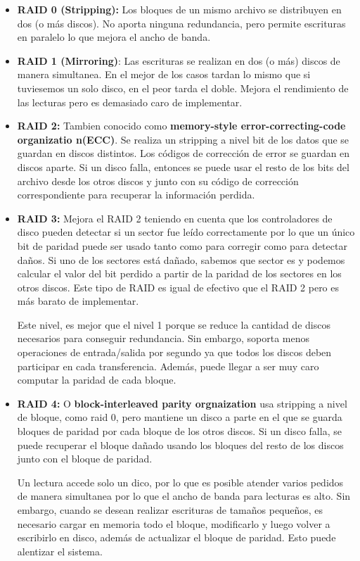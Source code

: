 \begin{itemize}
	\item \textbf{RAID 0 (Stripping):} Los bloques de un mismo archivo se distribuyen en dos (o más discos). No aporta ninguna redundancia, pero permite escrituras en paralelo lo que mejora el ancho de banda.
	\item \textbf{RAID 1 (Mirroring)}: Las escrituras se realizan en dos (o más) discos de manera simultanea. En el mejor de los casos tardan lo mismo que si tuviesemos un solo disco, en el peor tarda el doble. Mejora el rendimiento de las lecturas pero es demasiado caro de implementar.
	\item \textbf{RAID 2:} Tambien conocido como \textbf{memory-style error-correcting-code organizatio n(ECC)}. Se realiza un stripping a nivel bit de los datos que se guardan en discos distintos. Los códigos de corrección de error se guardan en discos aparte. Si un disco falla, entonces se puede usar el resto de los bits del archivo desde los otros discos y junto con su código de corrección correspondiente para recuperar la información perdida.
	\item \textbf{RAID 3:} Mejora el RAID 2 teniendo en cuenta que los controladores de disco pueden detectar si un sector fue leído correctamente por lo que un único bit de paridad puede ser usado tanto como para corregir como para detectar daños. Si uno de los sectores está dañado, sabemos que sector es y podemos calcular el valor del bit perdido a partir de la paridad de los sectores en los otros discos. Este tipo de RAID es igual de efectivo que el RAID 2 pero es más barato de implementar.
	
	Este nivel, es mejor que el nivel 1 porque se reduce la cantidad de discos necesarios para conseguir redundancia. Sin embargo, soporta menos operaciones de entrada/salida por segundo ya que todos los discos deben participar en cada transferencia. Además, puede llegar a ser muy caro computar la paridad de cada bloque.

	\item \textbf{RAID 4:} O \textbf{block-interleaved parity orgnaization} usa stripping a nivel de bloque, como raid 0, pero mantiene un disco a parte en el que se guarda bloques de paridad por cada bloque de los otros discos. Si un disco falla, se puede recuperar el bloque dañado usando los bloques del resto de los discos junto con el bloque de paridad.
	
	Un lectura accede solo un dico, por lo que es posible atender varios pedidos de manera simultanea por lo que el ancho de banda para lecturas es alto. Sin embargo, cuando se desean realizar escrituras de tamaños pequeños, es necesario cargar en memoria todo el bloque, modificarlo y luego volver a escribirlo en disco, además de actualizar el bloque de paridad. Esto puede alentizar el sistema.
	

\end{itemize}

